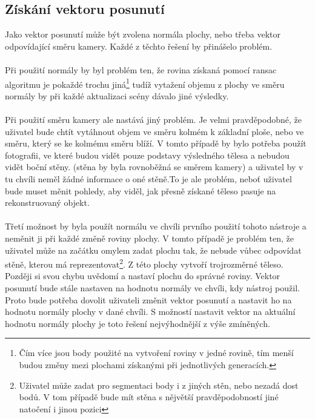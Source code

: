 \documentclass[11pt,twoside,a4paper]{book}
\begin{document}
\subsection{Získání vektoru posunutí}
\label{vektorPosunu}
Jako vektor posunutí může být zvolena normála plochy, nebo třeba vektor odpovídající směru kamery. Každé z těchto řešení by přinášelo problém. 
\paragraph{}
Při použití normály by byl problém ten, že rovina získaná pomocí ransac algoritmu je pokaždé trochu jiná\footnote{Čím více jsou body použité na vytvoření roviny v jedné rovině, tím menší budou změny mezi plochami získanými při jednotlivých generacích.} tudíž vytažení objemu z plochy ve směru normály by při každé aktualizaci scény dávalo jiné výsledky.
\paragraph{}
Při použití směru kamery ale nastává jiný problém. Je velmi pravděpodobné, že uživatel bude chtít vytáhnout objem ve směru kolmém k základní ploše, nebo ve směru, který se ke kolmému směru blíží. V tomto případě by bylo potřeba použít fotografii, ve které budou vidět pouze podstavy výsledného tělesa a nebudou vidět boční stěny. (stěna by byla rovnoběžná se směrem kamery) a uživatel by v tu chvíli neměl žádné informace o oné stěně.To je ale problém, neboť uživatel bude muset měnit pohledy, aby viděl, jak přesně získané těleso pasuje na rekonstruovaný objekt. 
\paragraph{}
Třetí možnost by byla použít normálu ve chvíli prvního použití tohoto nástroje a neměnit ji při každé změně roviny plochy. V tomto případě je problém ten, že uživatel může na začátku omylem zadat plochu tak, že nebude vůbec odpovídat stěně, kterou má reprezentovat\footnote{Uživatel může zadat pro segmentaci body i z jiných stěn, nebo nezadá dost bodů. V tom případě bude mít stěna s nějvětší pravděpodobností jiné natočení i jinou pozici}. Z této plochy vytvoří trojrozměrné těleso.  Později si svou chybu uvědomí a nastaví plochu do správné roviny. Vektor posunutí bude stále nastaven na hodnotu normály ve chvíli, kdy nástroj použil. Proto bude potřeba dovolit uživateli změnit vektor posunutí a nastavit ho na hodnotu normály plochy v dané chvíli. S možností nastavit vektor na aktuální hodnotu normály plochy je toto řešení nejvýhodnější z výše zmíněných.
\end{document}
